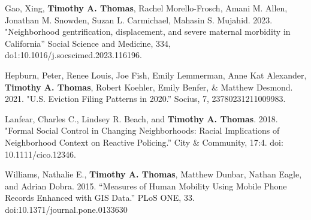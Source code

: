 



\begin{cvparagraph}

Gao, Xing, \textbf{Timothy A. Thomas}, Rachel Morello-Frosch, Amani M. Allen, Jonathan M. Snowden, Suzan L. Carmichael, Mahasin S. Mujahid.  
2023. "Neighborhood gentrification, displacement, and severe maternal morbidity in California” Social Science and Medicine, 334,  
do1:10.1016/j.socscimed.2023.116196.
\end{cvparagraph}

\begin{cvparagraph}

Hepburn, Peter, Renee Louis, Joe Fish, Emily Lemmerman, Anne Kat Alexander,  \textbf{Timothy A. Thomas}, Robert Koehler, Emily Benfer, \& Matthew Desmond. 2021. "U.S. Eviction Filing Patterns in 2020.” Socius, 7, 23780231211009983.
\end{cvparagraph}

\begin{cvparagraph}

Lanfear, Charles C., Lindsey R. Beach, and \textbf{Timothy A. Thomas}. 2018. "Formal Social Control in Changing Neighborhoods: Racial Implications of Neighborhood Context on Reactive Policing.” City \& Community, 17:4. doi: 10.1111/cico.12346.
\end{cvparagraph}

\begin{cvparagraph}

Williams, Nathalie E., \textbf{Timothy A. Thomas}, Matthew Dunbar, Nathan Eagle, and Adrian Dobra. 2015. “Measures of Human Mobility Using Mobile Phone Records Enhanced
with GIS Data.” PLoS ONE, 33. doi:10.1371/journal.pone.0133630
\end{cvparagraph}

